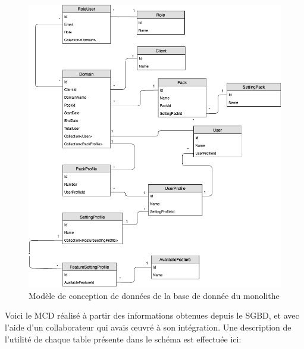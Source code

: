 \documentclass[a4paper, 11pt]{report}
\begin{document}
  \begin{figure}[h]
    \centering
    \includegraphics[scale=0.40,center]{schemas/ralph-diagram.png}
    \caption{Modèle de conception de données de la base de donnée du monolithe}
  \end{figure}
  Voici le MCD réalisé à partir des informations obtenues depuis le SGBD, et avec l'aide d'un collaborateur qui avais œuvré à son intégration.
  Une description de l'utilité de chaque table présente dans le schéma est effectuée ici:
\end{document}
